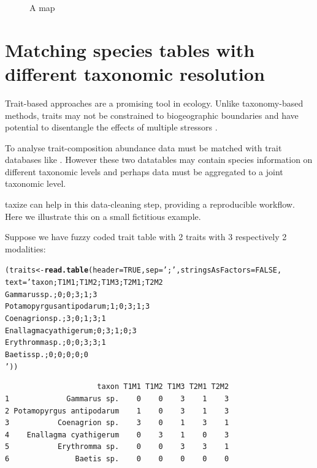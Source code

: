 \documentclass[letterpaper,superscriptaddress,showkeys,longbibliography,10pt]{revtex4-1}\usepackage{graphicx, color}
\makeatletter
\newcommand{\hlfunctioncall}[1]{\textcolor[rgb]{0.501960784313725,0,0.329411764705882}{\textbf{#1}}}%
\newcommand{\hlstring}[1]{\textcolor[rgb]{0.6,0.6,1}{#1}}%
\newenvironment{kframe}{%
 \def\at@end@of@kframe{}%
 \ifinner\ifhmode%
  \def\at@end@of@kframe{\end{minipage}}%
  \begin{minipage}{\columnwidth}%
 \fi\fi%
 \def\FrameCommand##1{\hskip\@totalleftmargin \hskip-\fboxsep
 \colorbox{shadecolor}{##1}\hskip-\fboxsep
     \hskip-\linewidth \hskip-\@totalleftmargin \hskip\columnwidth}%
 \MakeFramed {\advance\hsize-\width
   \@totalleftmargin\z@ \linewidth\hsize
   \@setminipage}}%
 {\par\unskip\endMakeFramed%
 \at@end@of@kframe}
\newenvironment{knitrout}{}{} %
\makeatother
\begin{document}
\begin{appendices}
\begin{knitrout}
\begin{figure}[h]
{}

\caption[A map]{A map\label{fig:mapplot_map}}
\end{figure}


\end{knitrout}



\newpage

\section{Matching species tables with different taxonomic resolution} 

Trait-based approaches are a promising tool in ecology. Unlike taxonomy-based methods, traits may not be constrained to biogeographic boundaries \citep{baird_toward_2011} and have potential to disentangle the effects of multiple stressors \citep{statzner_can_2010}. 

To analyse trait-composition abundance data must be matched with trait databases like \citet{usseglio-polatera_biological_2000}. However these two datatables may contain species information on different taxonomic levels and perhaps data must be aggregated to a joint taxonomic level.

taxize can help in this data-cleaning step, providing a reproducible workflow. Here we illustrate this on a small fictitious example.

Suppose we have fuzzy coded trait table with 2 traits with 3 respectively 2 modalities:
\begin{knitrout}
\color{fgcolor}\begin{kframe}
\begin{alltt}
(traits <- \hlfunctioncall{read.table}(header = TRUE, sep = \hlstring{';'}, stringsAsFactors=FALSE, 
                      text = 'taxon;T1M1;T1M2;T1M3;T2M1;T2M2
Gammarus sp.;0;0;3;1;3
Potamopyrgus antipodarum;1;0;3;1;3
Coenagrion sp.;3;0;1;3;1
Enallagma cyathigerum;0;3;1;0;3
Erythromma sp.;0;0;3;3;1
Baetis sp.;0;0;0;0;0
'))
\end{alltt}
\begin{verbatim}
                     taxon T1M1 T1M2 T1M3 T2M1 T2M2
1             Gammarus sp.    0    0    3    1    3
2 Potamopyrgus antipodarum    1    0    3    1    3
3           Coenagrion sp.    3    0    1    3    1
4    Enallagma cyathigerum    0    3    1    0    3
5           Erythromma sp.    0    0    3    3    1
6               Baetis sp.    0    0    0    0    0
\end{verbatim}
\end{kframe}
\end{knitrout}



\end{appendices}
\end{document}
